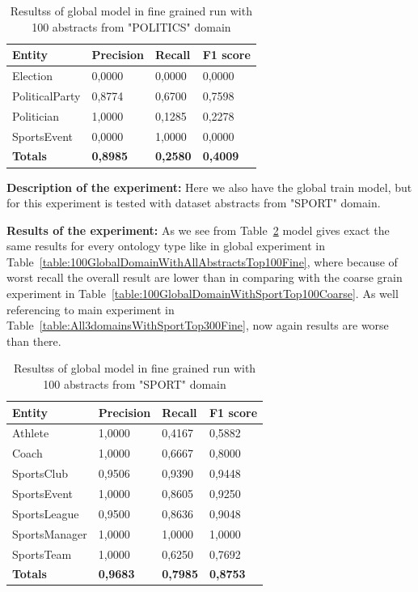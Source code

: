 \documentclass[thesis=M,english]{FITthesis}[2018/05/30]
\begin{document}
	\begin{table}[H]\centering
		\begin{tabular}{|l|l|l|l|}
			\hline {\textbf{Entity}} & {\textbf{Precision}} & {\textbf{Recall}} & {\textbf{F1 score}}\\\hline
				Election & 0,0000 & 0,0000 & 0,0000\\
				PoliticalParty & 0,8774 & 0,6700 & 0,7598\\
				Politician & 1,0000 & 0,1285 & 0,2278\\
				SportsEvent & 0,0000 & 1,0000 & 0,0000\\\hline
				\textbf{Totals} & \textbf{0,8985} & \textbf{0,2580} & \textbf{0,4009}\\\hline
		\end{tabular}
		\caption{Resultss of global model in fine grained run with 100 abstracts from "POLITICS" domain \label{table:100GlobalDomainWithPoliticsTop100Fine}}
	\end{table}	


	\textbf{Description of the experiment:} Here we also have the global train model, but for this experiment is tested with dataset abstracts from "SPORT" domain.

	\textbf{Results of the experiment:} As we see from Table~\ref{table:100GlobalDomainWithSportTop100Fine} model gives exact the same results for every ontology type like in global experiment in Table~\ref{table:100GlobalDomainWithAllAbstractsTop100Fine}, where because of worst recall the overall result are lower than in comparing with the coarse grain experiment in Table~\ref{table:100GlobalDomainWithSportTop100Coarse}. As well referencing to main experiment in Table~\ref{table:All3domainsWithSportTop300Fine}, now again results are worse than there.  

	\begin{table}[H]\centering
		\begin{tabular}{|l|l|l|l|}
			\hline {\textbf{Entity}} & {\textbf{Precision}} & {\textbf{Recall}} & {\textbf{F1 score}}\\\hline
				Athlete & 1,0000 & 0,4167 & 0,5882\\
				Coach & 1,0000 & 0,6667 & 0,8000\\
				SportsClub & 0,9506 & 0,9390 & 0,9448\\
				SportsEvent & 1,0000 & 0,8605 & 0,9250\\
				SportsLeague & 0,9500 & 0,8636 & 0,9048\\
				SportsManager & 1,0000 & 1,0000 & 1,0000\\				
				SportsTeam & 1,0000 & 0,6250 & 0,7692\\\hline
				\textbf{Totals} & \textbf{0,9683} & \textbf{0,7985} & \textbf{0,8753}\\\hline
		\end{tabular}
		\caption{Resultss of global model in fine grained run with 100 abstracts from "SPORT" domain \label{table:100GlobalDomainWithSportTop100Fine}}
	\end{table}	
\end{document}
